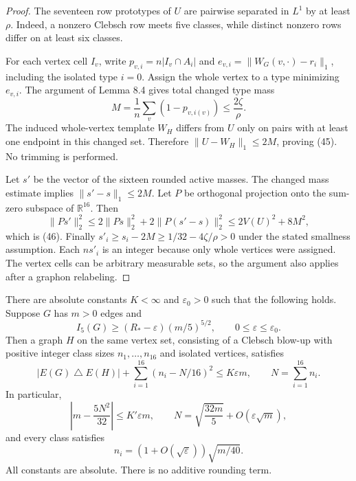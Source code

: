\begin{proof}
The seventeen row prototypes of $U$ are pairwise separated in $L^1$ by at
least $\rho$. Indeed, a nonzero Clebsch row meets five classes, while distinct
nonzero rows differ on at least six classes.

For each vertex cell $I_v$, write $p_{v,i}=n|I_v\cap A_i|$ and
$e_{v,i}=\|W_G(v,\cdot)-r_i\|_1$, including the isolated type $i=0$.
Assign the whole vertex to a type minimizing $e_{v,i}$. The argument of
Lemma 8.4 gives total changed type mass
\[
 M=\frac1n\sum_v(1-p_{v,i(v)})\leq\frac{2\zeta}{\rho}.
\]
The induced whole-vertex template $W_H$ differs from $U$ only on pairs
with at least one endpoint in this changed set. Therefore
$\|U-W_H\|_1\leq2M$, proving (45). No trimming is performed.

Let $s'$ be the vector of the sixteen rounded active masses. The changed
mass estimate implies $\|s'-s\|_1\leq2M$. Let $P$ be orthogonal projection
onto the sum-zero subspace of $\mathbb R^{16}$. Then
\[
 \|Ps'\|_2^2\leq2\|Ps\|_2^2+2\|P(s'-s)\|_2^2
 \leq2V(U)^2+8M^2,
\]
which is (46). Finally
$s'_i\geq s_i-2M\geq1/32-4\zeta/\rho>0$ under the stated smallness
assumption. Each $ns'_i$ is an integer because only whole vertices were
assigned. The vertex cells can be arbitrary measurable sets, so the argument
also applies after a graphon relabeling.
\end{proof}

\begin{theorem}\label{thm:linear-stability}
There are absolute constants $K<\infty$ and $\varepsilon_0>0$ such that the
following holds. Suppose $G$ has $m>0$ edges and
\[
 I_5(G)\geq(R_\ast-\varepsilon)(m/5)^{5/2},\qquad
 0\leq\varepsilon\leq\varepsilon_0.
\]
Then a graph $H$ on the same vertex set, consisting of a Clebsch blow-up with
positive integer class sizes $n_1,\ldots,n_{16}$ and isolated vertices,
satisfies
\begin{equation}\tag{47}\label{eq:47}
 |E(G)\mathbin{\triangle}E(H)|+\sum_{i=1}^{16}(n_i-N/16)^2
 \leq K\varepsilon m,\qquad N=\sum_{i=1}^{16}n_i.
\end{equation}
In particular,
\begin{equation}\tag{48}\label{eq:48}
 \left|m-\frac{5N^2}{32}\right|\leq K'\varepsilon m,\qquad
 N=\sqrt{\frac{32m}5}+O(\varepsilon\sqrt m),
\end{equation}
and every class satisfies
\[
 n_i=(1+O(\sqrt\varepsilon))\sqrt{m/40}.
\]
All constants are absolute. There is no additive rounding term.
\end{theorem}

